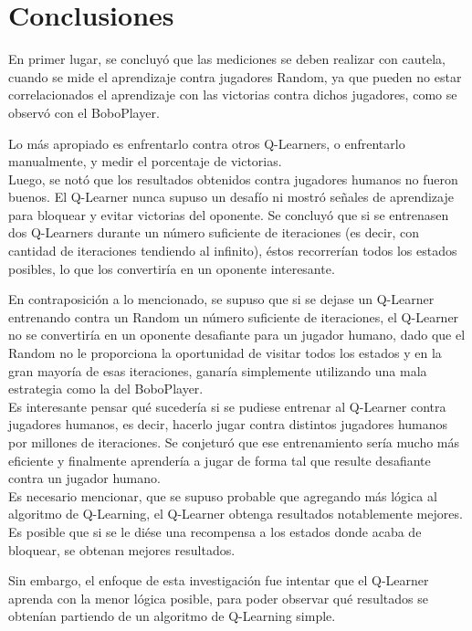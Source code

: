 \section{Conclusiones}
En primer lugar, se concluyó que las mediciones se deben realizar con cautela, cuando se mide el aprendizaje contra jugadores Random, ya que pueden no estar correlacionados el aprendizaje con las victorias contra dichos jugadores, como se observó con el BoboPlayer. 

Lo más apropiado es enfrentarlo contra otros Q-Learners, o enfrentarlo manualmente, y medir el porcentaje de victorias.\\

Luego, se notó que los resultados obtenidos contra jugadores humanos no fueron buenos. El Q-Learner nunca supuso un desafío ni mostró señales de aprendizaje para bloquear y evitar victorias del oponente. Se concluyó que si se entrenasen dos Q-Learners durante un número suficiente de iteraciones (es decir, con cantidad de iteraciones tendiendo al infinito), éstos recorrerían todos los estados posibles, lo que los convertiría en un oponente interesante. 

En contraposición a lo mencionado, se supuso que si se dejase un Q-Learner entrenando contra un Random un número suficiente de iteraciones, el Q-Learner no se convertiría en un oponente desafiante para un jugador humano, dado que el Random no le proporciona la oportunidad de visitar todos los estados y en la gran mayoría de esas iteraciones, ganaría simplemente utilizando una mala estrategia como la del BoboPlayer.\\

Es interesante pensar qué sucedería si se pudiese entrenar al Q-Learner contra jugadores humanos, es decir, hacerlo jugar contra distintos jugadores humanos por millones de iteraciones. Se conjeturó que ese entrenamiento sería mucho más eficiente y finalmente aprendería a jugar de forma tal que resulte desafiante contra un jugador humano.\\

Es necesario mencionar, que se supuso probable que agregando más lógica al algoritmo de Q-Learning, el Q-Learner obtenga resultados notablemente mejores. Es posible que si se le diése una recompensa a los estados donde acaba de bloquear, se obtenan mejores resultados. 

Sin embargo, el enfoque de esta investigación fue intentar que el Q-Learner aprenda con la menor lógica posible, para poder observar qué resultados se obtenían partiendo de un algoritmo de Q-Learning simple.
